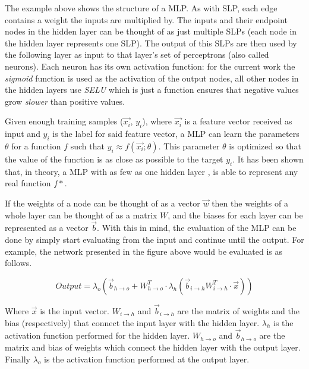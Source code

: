 \documentclass[epsfig,a4paper,11pt,titlepage,twoside,openany]{book}
\begin{document}
The example above shows the structure of a MLP. As with SLP, each edge contains a weight the inputs are multiplied by. The inputs and their endpoint nodes in the hidden layer can be thought of as just multiple SLPs (each node in the hidden layer represents one SLP). The output of this SLPs are then used by the following layer as input to that layer's set of perceptrons (also called neurons). Each neuron has its own activation function: for the current work the \textit{sigmoid} function is used as the activation of the output nodes, all other nodes in the hidden layers use \textit{SELU}  \cite{klambauer2017selfnormalizing} which is just a function ensures that negative values grow \textit{slower} than positive values. 



Given enough training samples ($\vec{x_i}$, $y_i$), where $\vec{x_i}$ is a feature vector received as input and $y_i$ is the label for said feature vector, a MLP can learn the parameters $\theta$ for a function $f$ such that $y_i \approx f(\vec{x_i}; \theta)$. This parameter $\theta$ is optimized so that the value of the function is as close as possible to the target $y_i$. It has been shown \cite{csaji2001approximation} that, in theory, a MLP with as few as one hidden layer \cite{Hornik1991_approximation}, is able to represent any real function $f*$.

If the weights of a node can be thought of as a vector $\vec{w}$ then the weights of a whole layer can be thought of as a matrix $W$, and the biases for each layer can be represented as a vector $\vec{b}$. With this in mind, the evaluation of the MLP can be done by simply start evaluating from the input and continue until the output. For example, the network presented in the figure above would be evaluated is as follows.

\begin{equation*}
    Output = \lambda_{o}(\vec{b}_{h \to o} + W_{h \to o}^T \cdot \lambda_{h}(\vec{b}_{i \to h} W_{i \to h}^T \cdot \vec{x})) 
\end{equation*}

Where $\vec{x}$ is the input vector. $W_{i \to h}$ and $\vec{b}_{i \to h}$ are the matrix of weights and the bias (respectively) that connect the input layer with the hidden layer. $\lambda_{h}$ is the activation function performed for the hidden layer. $W_{h \to o}$ and  $\vec{b}_{h \to o}$ are the matrix and bias of weights which connect the hidden layer with the output layer. Finally $\lambda_{o}$ is the activation function performed at the output layer.
\end{document}

